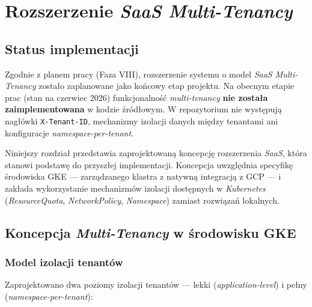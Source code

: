 \chapter{Rozszerzenie \textit{SaaS Multi-Tenancy}}

\section{Status implementacji}

Zgodnie z planem pracy (Faza VIII), rozszerzenie systemu o model \textit{SaaS Multi-Tenancy} zostało zaplanowane jako końcowy etap projektu. Na obecnym etapie prac (stan na czerwiec 2026) funkcjonalność \textit{multi-tenancy} \textbf{nie została zaimplementowana} w kodzie źródłowym. W repozytorium nie występują nagłówki \texttt{X-Tenant-ID}, mechanizmy izolacji danych między tenantami ani konfiguracje \textit{namespace-per-tenant}.

Niniejszy rozdział przedstawia zaprojektowaną koncepcję rozszerzenia \textit{SaaS}, która stanowi podstawę do przyszłej implementacji. Koncepcja uwzględnia specyfikę środowiska GKE — zarządzanego klastra z natywną integracją z GCP — i zakłada wykorzystanie mechanizmów izolacji dostępnych w \textit{Kubernetes} (\textit{ResourceQuota}, \textit{NetworkPolicy}, \textit{Namespace}) zamiast rozwiązań lokalnych.

\section{Koncepcja \textit{Multi-Tenancy} w środowisku GKE}

\subsection{Model izolacji tenantów}

Zaprojektowano dwa poziomy izolacji tenantów — lekki (\textit{application-level}) i pełny (\textit{namespace-per-tenant}):

